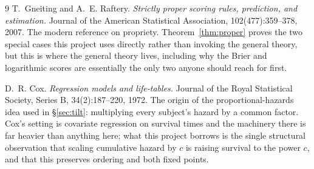 \documentclass[10pt,a4paper]{article}
\theoremstyle{plain}
\theoremstyle{definition}
\theoremstyle{remark}
\begin{document}
\begin{thebibliography}{9}
T.~Gneiting and A.~E. Raftery.
\emph{Strictly proper scoring rules, prediction, and estimation.}
Journal of the American Statistical Association, 102(477):359--378, 2007.
The modern reference on propriety. Theorem~\ref{thm:proper} proves the two special cases
this project uses directly rather than invoking the general theory, but this is where
the general theory lives, including why the Brier and logarithmic scores are essentially
the only two anyone should reach for first.

D.~R. Cox.
\emph{Regression models and life-tables.}
Journal of the Royal Statistical Society, Series B, 34(2):187--220, 1972.
The origin of the proportional-hazards idea used in \S\ref{sec:tilt}: multiplying every
subject's hazard by a common factor. Cox's setting is covariate regression on survival
times and the machinery there is far heavier than anything here; what this project
borrows is the single structural observation that scaling cumulative hazard by $c$ is
raising survival to the power $c$, and that this preserves ordering and both fixed
points.

\end{thebibliography}
\end{document}
